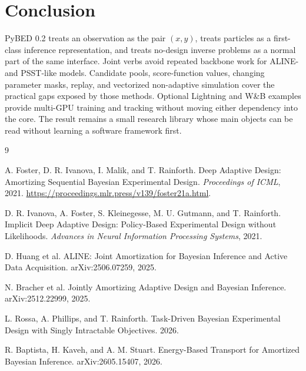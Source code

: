 \documentclass[11pt]{article}
\begin{document}
\section{Conclusion}

PyBED 0.2 treats an observation as the pair $(x,y)$, treats particles as a
first-class inference representation, and treats no-design inverse problems as a
normal part of the same interface. Joint verbs avoid repeated backbone work for
ALINE- and PSST-like models. Candidate pools, score-function values, changing
parameter masks, replay, and vectorized non-adaptive simulation cover the practical
gaps exposed by those methods. Optional Lightning and W\&B examples provide
multi-GPU training and tracking without moving either dependency into the core.
The result remains a small research library whose main objects can be read without
learning a software framework first.

\begin{thebibliography}{9}

A. Foster, D. R. Ivanova, I. Malik, and T. Rainforth.
Deep Adaptive Design: Amortizing Sequential Bayesian Experimental Design.
\emph{Proceedings of ICML}, 2021.
\url{https://proceedings.mlr.press/v139/foster21a.html}.

D. R. Ivanova, A. Foster, S. Kleinegesse, M. U. Gutmann, and T. Rainforth.
Implicit Deep Adaptive Design: Policy-Based Experimental Design without Likelihoods.
\emph{Advances in Neural Information Processing Systems}, 2021.

D. Huang et al.
ALINE: Joint Amortization for Bayesian Inference and Active Data Acquisition.
arXiv:2506.07259, 2025.

N. Bracher et al.
Jointly Amortizing Adaptive Design and Bayesian Inference.
arXiv:2512.22999, 2025.

L. Rossa, A. Phillips, and T. Rainforth.
Task-Driven Bayesian Experimental Design with Singly Intractable Objectives.
2026.

R. Baptista, H. Kaveh, and A. M. Stuart.
Energy-Based Transport for Amortized Bayesian Inference.
arXiv:2605.15407, 2026.

\end{thebibliography}
\end{document}

